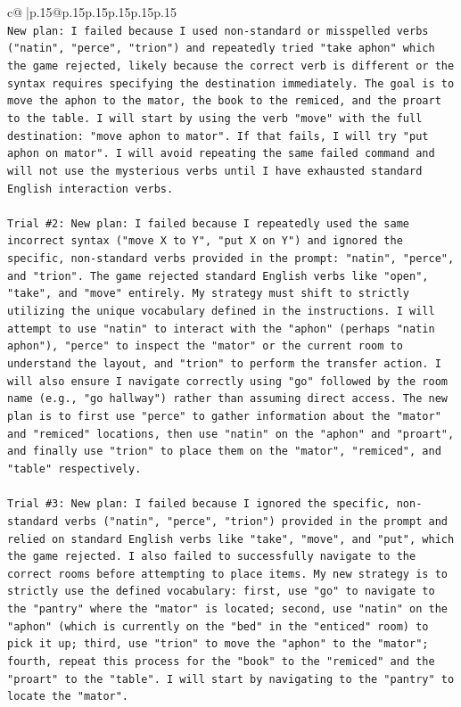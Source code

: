 \documentclass{article}
\begin{document}
{\begin{supertabular}{c@{$\;$}|p{.15\linewidth}@{}p{.15\linewidth}p{.15\linewidth}p{.15\linewidth}p{.15\linewidth}p{.15\linewidth}}
{{{\\ 
\texttt{New plan: I failed because I used non{-}standard or misspelled verbs ("natin", "perce", "trion") and repeatedly tried "take aphon" which the game rejected, likely because the correct verb is different or the syntax requires specifying the destination immediately. The goal is to move the aphon to the mator, the book to the remiced, and the proart to the table. I will start by using the verb "move" with the full destination: "move aphon to mator". If that fails, I will try "put aphon on mator". I will avoid repeating the same failed command and will not use the mysterious verbs until I have exhausted standard English interaction verbs.} \\
\\ 
\texttt{Trial \#2: New plan: I failed because I repeatedly used the same incorrect syntax ("move X to Y", "put X on Y") and ignored the specific, non{-}standard verbs provided in the prompt: "natin", "perce", and "trion". The game rejected standard English verbs like "open", "take", and "move" entirely. My strategy must shift to strictly utilizing the unique vocabulary defined in the instructions. I will attempt to use "natin" to interact with the "aphon" (perhaps "natin aphon"), "perce" to inspect the "mator" or the current room to understand the layout, and "trion" to perform the transfer action. I will also ensure I navigate correctly using "go" followed by the room name (e.g., "go hallway") rather than assuming direct access. The new plan is to first use "perce" to gather information about the "mator" and "remiced" locations, then use "natin" on the "aphon" and "proart", and finally use "trion" to place them on the "mator", "remiced", and "table" respectively.} \\
\\ 
\texttt{Trial \#3: New plan: I failed because I ignored the specific, non{-}standard verbs ("natin", "perce", "trion") provided in the prompt and relied on standard English verbs like "take", "move", and "put", which the game rejected. I also failed to successfully navigate to the correct rooms before attempting to place items. My new strategy is to strictly use the defined vocabulary: first, use "go" to navigate to the "pantry" where the "mator" is located; second, use "natin" on the "aphon" (which is currently on the "bed" in the "enticed" room) to pick it up; third, use "trion" to move the "aphon" to the "mator"; fourth, repeat this process for the "book" to the "remiced" and the "proart" to the "table". I will start by navigating to the "pantry" to locate the "mator".} \\
}}}
\end{supertabular}}
\end{document}
